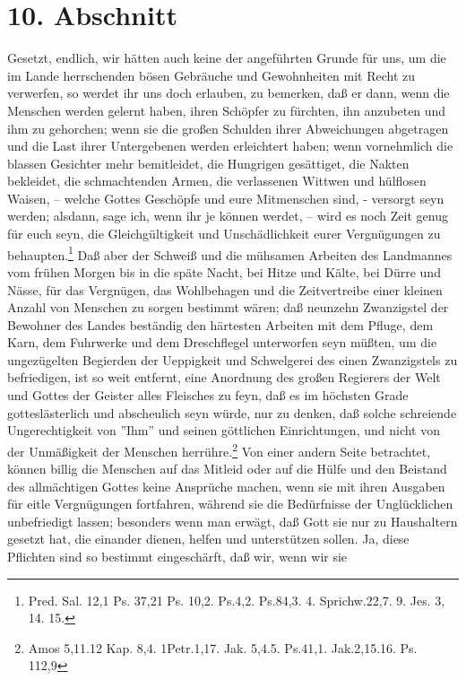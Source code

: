 \section{10. Abschnitt} \label{kap18_ab10}

Gesetzt, endlich, wir hätten auch keine der angeführten Grunde für uns, um die
im Lande herrschenden bösen Gebräuche und Gewohnheiten mit Recht zu verwerfen,
so werdet ihr uns doch erlauben, zu bemerken, daß er dann, wenn die Menschen
werden gelernt haben, ihren Schöpfer zu fürchten, ihn anzubeten und ihm zu
gehorchen; wenn sie die großen Schulden ihrer Abweichungen abgetragen und die
Last ihrer Untergebenen werden erleichtert haben; wenn vornehmlich die blassen
Gesichter mehr bemitleidet, die Hungrigen gesättiget, die Nakten bekleidet, die
schmachtenden Armen, die verlassenen Wittwen und hülflosen Waisen, -- welche
Gottes Geschöpfe und eure Mitmenschen sind, - versorgt seyn werden; alsdann,
sage ich, wenn ihr je können werdet, – wird es noch Zeit genug für euch seyn,
die Gleichgültigkeit und Unschädlichkeit eurer Vergnügungen zu
behaupten.\footnote{Pred. Sal. 12,1 Ps. 37,21 Ps. 10,2. Ps.4,2. Ps.84,3. 4.
Sprichw.22,7. 9. Jes. 3, 14. 15.} Daß aber der Schweiß und die mühsamen Arbeiten
des Landmannes vom frühen Morgen bis in die späte Nacht, bei Hitze und Kälte,
bei Dürre und Nässe, für das Vergnügen, das Wohlbehagen und die Zeitvertreibe
einer kleinen Anzahl von Menschen zu sorgen bestimmt wären; daß neunzehn
Zwanzigstel der Bewohner des Landes beständig den härtesten Arbeiten mit dem
Pfluge, dem Karn, dem Fuhrwerke und dem Dreschflegel unterworfen seyn müßten, um
die ungezügelten Begierden der Ueppigkeit und Schwelgerei des einen Zwanzigstels
zu befriedigen, ist so weit entfernt, eine Anordnung des großen Regierers der
Welt und Gottes der Geister alles Fleisches zu feyn, daß es im höchsten Grade
gotteslästerlich und abscheulich seyn würde, nur zu denken, daß solche
schreiende Ungerechtigkeit von ''Ihm'' und seinen göttlichen Einrichtungen, und
nicht von der Unmäßigkeit der Menschen herrühre.\footnote{Amos 5,11.12 Kap. 8,4.
1Petr.1,17. Jak. 5,4.5. Ps.41,1. Jak.2,15.16. Ps. 112,9} Von einer andern Seite
betrachtet, können billig die Menschen auf das Mitleid oder auf die Hülfe und
den Beistand des allmächtigen Gottes keine Ansprüche machen, wenn sie mit ihren
Ausgaben für eitle Vergnügungen fortfahren, während sie die Bedürfnisse der
Unglücklichen unbefriedigt lassen; besonders wenn man erwägt, daß Gott sie nur
zu Haushaltern gesetzt hat, die einander dienen, helfen und unterstützen sollen.
Ja, diese Pflichten sind so bestimmt eingeschärft, daß wir, wenn wir sie
